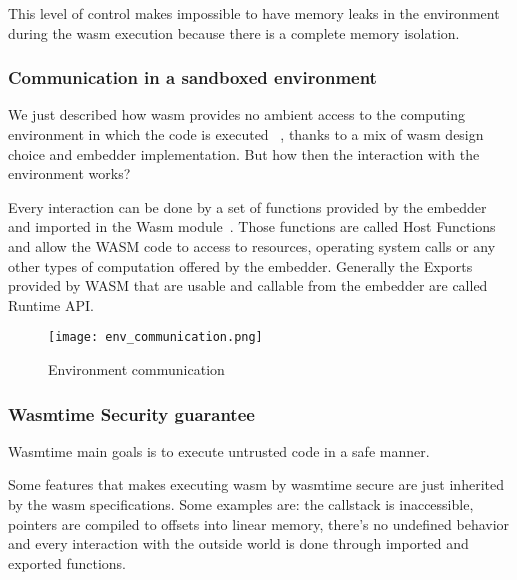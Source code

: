 \documentclass[../main.tex]{subfiles}
\begin{document}
This level of control makes impossible to have memory leaks in the environment during the wasm execution because there is a complete memory isolation. ~\cite{linear-memory}

\subsubsection{Communication in a sandboxed environment}

We just described how wasm provides no ambient access to the computing environment in which the code is executed ~\cite{wasm-core-spec}, thanks to a mix of wasm design choice and embedder implementation. But how  then the interaction with the environment works?



Every interaction can be done by a set of functions provided by the embedder and imported in the Wasm module~\cite{wasm-core-spec}. Those functions are called Host Functions and allow the WASM code to access to resources, operating system calls or any other types of computation offered by the embedder. Generally the Exports provided by WASM that are usable and callable from the embedder are called Runtime API.

\begin{figure}[h]
  \centering
  \texttt{[image: env\_communication.png]}
  \caption{Environment communication}
  \label{fig:env-communication}
\end{figure}

\subsubsection{Wasmtime Security guarantee}



Wasmtime main goals is to execute untrusted code in a safe manner.~\cite{wasmtime-book}

Some features that makes executing wasm by wasmtime secure are just inherited by the wasm specifications. Some examples are: the callstack is inaccessible, pointers are compiled to offsets into linear memory, there's no undefined behavior and every interaction with the outside world is done through imported and exported functions.~\cite{wasmtime-book}
\end{document}
